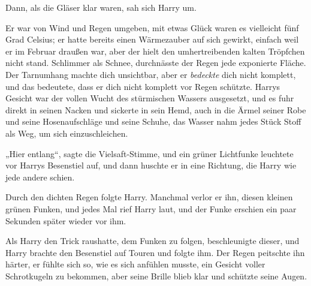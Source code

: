 Dann, als die Gläser klar waren, sah sich Harry um.

Er war von Wind und Regen umgeben, mit etwas Glück waren es vielleicht fünf Grad Celsius; er hatte bereits einen Wärmezauber auf sich gewirkt, einfach weil er im Februar draußen war, aber der hielt den umhertreibenden kalten Tröpfchen nicht stand. Schlimmer als Schnee, durchnässte der Regen jede exponierte Fläche. Der Tarnumhang machte dich unsichtbar, aber er \emph{bedeckte} dich nicht komplett, und das bedeutete, dass er dich nicht komplett vor Regen schützte. Harrys Gesicht war der vollen Wucht des stürmischen Wassers ausgesetzt, und es fuhr direkt in seinen Nacken und sickerte in sein Hemd, auch in die Ärmel seiner Robe und seine Hosenaufschläge und seine Schuhe, das Wasser nahm jedes Stück Stoff als Weg, um sich einzuschleichen.

„Hier entlang“, sagte die Vielsaft-Stimme, und ein grüner Lichtfunke leuchtete vor Harrys Besenstiel auf, und dann huschte er in eine Richtung, die Harry wie jede andere schien.

Durch den dichten Regen folgte Harry. Manchmal verlor er ihn, diesen kleinen grünen Funken, und jedes Mal rief Harry laut, und der Funke erschien ein paar Sekunden später wieder vor ihm.

Als Harry den Trick raushatte, dem Funken zu folgen, beschleunigte dieser, und Harry brachte den Besenstiel auf Touren und folgte ihm. Der Regen peitschte ihn härter, er fühlte sich so, wie es sich anfühlen musste, ein Gesicht voller Schrotkugeln zu bekommen, aber seine Brille blieb klar und schützte seine Augen.


